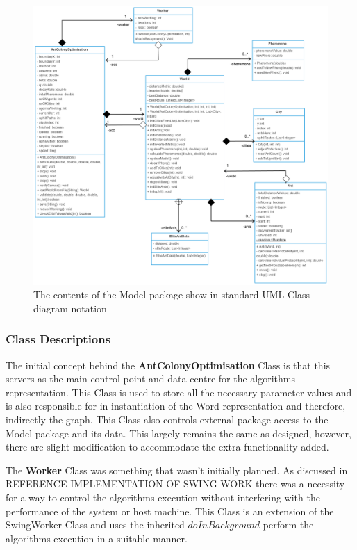 \clearpage
\begin{figure}
\includegraphics[scale=0.22]{Images/chapter4/model}
\caption{The contents of the Model package show in standard UML Class diagram notation}
\label{fig:classdiagramImp}
\end{figure}
\clearpage


\subsubsection{Class Descriptions}
\label{model:classdef}

The initial concept behind the \textbf{AntColonyOptimisation} Class is that this servers as the main control point and data centre for the algorithms representation. This Class is used to store all the necessary parameter values and is also responsible for in instantiation of the Word representation and therefore, indirectly the graph. This Class also controls external package access to the Model package and its data. This largely remains the same as designed, however, there are slight modification to accommodate the extra functionality added.

The \textbf{Worker} Class was something that wasn’t initially planned. As discussed in \Large REFERENCE IMPLEMENTATION OF SWING WORK \normalsize there was a necessity for a way to control the algorithms execution without interfering with the performance of the system or host machine. This Class is an extension of the SwingWorker Class and uses the inherited $doInBackground$ perform the algorithms execution in a suitable manner. 

